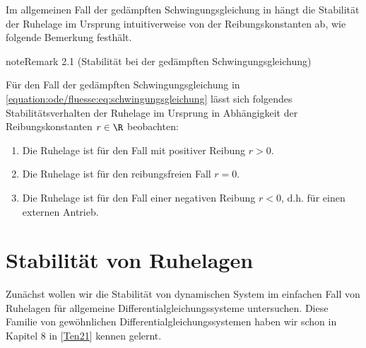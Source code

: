 \documentclass[letterpaper,10pt,german]{jupyterBook}
\begin{document}
\sphinxAtStartPar
Im allgemeinen Fall der gedämpften Schwingungsgleichung in {\hyperref[\detokenize{ode/fluesse:ex:oscillations}]{}} hängt die Stabilität der Ruhelage im Ursprung intuitiverweise von der Reibungskonstanten ab, wie folgende Bemerkung festhält.
\label{odestability/stabilitaetsbegriffe:remark-2}
\begin{sphinxadmonition}{note}{Remark 2.1 (Stabilität bei der gedämpften Schwingungsgleichung)}



\sphinxAtStartPar
Für den Fall der gedämpften Schwingungsgleichung in \eqref{equation:ode/fluesse:eq:schwingungsgleichung} lässt sich folgendes Stabilitätsverhalten der Ruhelage im Ursprung in Abhängigkeit der Reibungskonstanten \(r \in \R\) beobachten:
\begin{enumerate}
%
\item {} 
\sphinxAtStartPar
Die Ruhelage ist  für den Fall mit positiver Reibung \(r>0\).

\item {} 
\sphinxAtStartPar
Die Ruhelage ist  für den reibungsfreien Fall \(r=0\).

\item {} 
\sphinxAtStartPar
Die Ruhelage ist  für den Fall einer negativen Reibung \(r < 0\), d.h. für einen externen Antrieb.

\end{enumerate}
\end{sphinxadmonition}


\section{Stabilität von Ruhelagen}
\label{\detokenize{odestability/ruhelagen:stabilitat-von-ruhelagen}}\label{\detokenize{odestability/ruhelagen::doc}}
\sphinxAtStartPar
Zunächst wollen wir die Stabilität von dynamischen System im einfachen Fall von Ruhelagen für allgemeine  Differentialgleichungssysteme untersuchen.
Diese Familie von gewöhnlichen Differentialgleichungssystemen haben wir schon in Kapitel 8 in {[}\hyperlink{cite.references:id15}{Ten21}{]} kennen gelernt.
\end{document}
